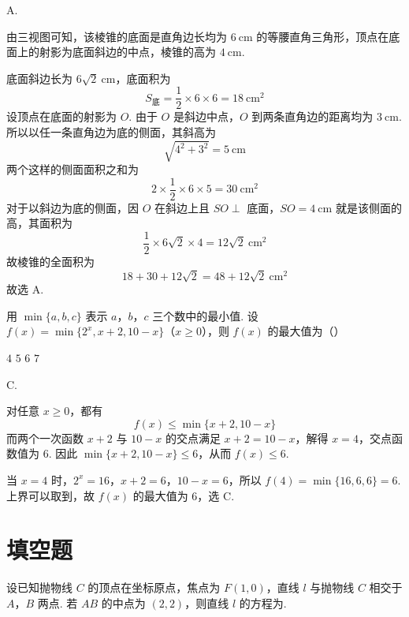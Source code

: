 \begin{answer}
A.
\end{answer}

\begin{solution}
由三视图可知，该棱锥的底面是直角边长均为 \(6\mathrm{~cm}\) 的等腰直角三角形，顶点在底面上的射影为底面斜边的中点，棱锥的高为 \(4\mathrm{~cm}\).

底面斜边长为 \(6\sqrt2\mathrm{~cm}\)，底面积为
\[
S_\text{底}=\frac12\times6\times6=18\mathrm{~cm}^2
\]
设顶点在底面的射影为 \(O\). 由于 \(O\) 是斜边中点，\(O\) 到两条直角边的距离均为 \(3\mathrm{~cm}\). 所以以任一条直角边为底的侧面，其斜高为
\[
\sqrt{4^2+3^2}=5\mathrm{~cm}
\]
两个这样的侧面面积之和为
\[
2\times\frac12\times6\times5=30\mathrm{~cm}^2
\]
对于以斜边为底的侧面，因 \(O\) 在斜边上且 \(SO\perp\) 底面，\(SO=4\mathrm{~cm}\) 就是该侧面的高，其面积为
\[
\frac12\times6\sqrt2\times4=12\sqrt2\mathrm{~cm}^2
\]
故棱锥的全面积为
\[
18+30+12\sqrt2=48+12\sqrt2\mathrm{~cm}^2
\]
故选 A.
\end{solution}

\begin{problem}
用 \(\min \{a, b, c\}\) 表示 \(a\)，\(b\)，\(c\) 三个数中的最小值. 设 \(f(x) = \min \{2^x, x + 2, 10 - x\}\)（\(x \geqslant 0\)），则 \(f(x)\) 的最大值为（\quad）

\choices
    {\(4\)}
    {\(5\)}
    {\(6\)}
    {\(7\)}
\end{problem}

\begin{answer}
C.
\end{answer}

\begin{solution}
对任意 \(x\geqslant0\)，都有
\[
f(x)\leqslant\min\{x+2,10-x\}
\]
而两个一次函数 \(x+2\) 与 \(10-x\) 的交点满足
\(x+2=10-x\)，解得 \(x=4\)，交点函数值为 \(6\). 因此
\(\min\{x+2,10-x\}\leqslant6\)，从而 \(f(x)\leqslant6\).

当 \(x=4\) 时，\(2^x=16\)，\(x+2=6\)，\(10-x=6\)，所以
\(f(4)=\min\{16,6,6\}=6\). 上界可以取到，故 \(f(x)\) 的最大值为 \(6\)，选 C.
\end{solution}

\section{填空题}

\begin{problem}
设已知抛物线 \(C\) 的顶点在坐标原点，焦点为 \(F(1,0)\)，直线 \(l\) 与抛物线 \(C\) 相交于 \(A\)，\(B\) 两点. 若 \(AB\) 的中点为 \((2,2)\)，则直线 \(l\) 的方程为\fillinblank{}.
\end{problem}

